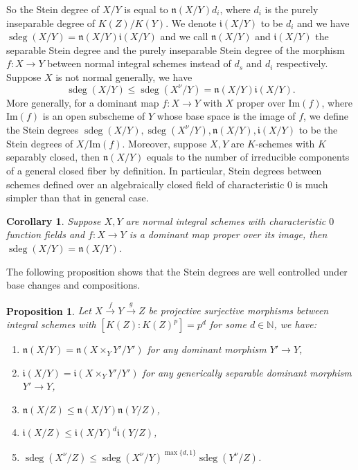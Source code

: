 \documentclass[letterpaper,reqno,12pt]{amsart}
\DeclareMathOperator{\sdeg}{sdeg}
\numberwithin{equation}{section}
\theoremstyle{plain}
\newtheorem{proposition}[theorem]{Proposition}
\newtheorem{corollary}[theorem]{Corollary}
\begin{document}
So the Stein degree of $X/Y$ is equal to $\mathfrak n(X/Y)d_i$, where $d_i$ is the purely inseparable degree of $K(Z)/K(Y)$. We denote $\mathfrak i(X/Y)$ to be $d_i$ and we have $\sdeg(X/Y)=\mathfrak n(X/Y)\mathfrak i(X/Y)$ and we call $\mathfrak n(X/Y)$ and $\mathfrak i(X/Y)$ the separable Stein degree and the purely inseparable Stein degree of the morphism $f:X\to Y$ between normal integral schemes instead of $d_s$ and $d_i$ respectively. Suppose $X$ is not normal generally, we have 
\[\sdeg(X/Y)\leq\sdeg(X^\nu/Y)=\mathfrak n(X/Y)\mathfrak i(X/Y).\]
More generally, for a dominant map $f:X\to Y$ with $X$ proper over $\text{Im}(f)$, where $\text{Im}(f)$ is an open subscheme of $Y$ whose base space is the image of $f$, we define the Stein degrees $\sdeg(X/Y),\sdeg(X^\nu/Y),\mathfrak n(X/Y),\mathfrak i(X/Y)$ to be the Stein degrees of $X/\text{Im}(f)$. Moreover, suppose $X,Y$ are $K$-schemes with $K$ separably closed, then $\mathfrak n(X/Y)$ equals to the number of irreducible components of a general closed fiber by definition. In particular, Stein degrees between schemes defined over an algebraically closed field of characteristic $0$ is much simpler than that in general case.
\begin{corollary}
    Suppose $X,Y$ are normal integral schemes with characteristic $0$ function fields and $f:X\to Y$ is a dominant map proper over its image, then $\sdeg(X/Y)=\mathfrak n(X/Y)$.
\end{corollary}
The following proposition shows that the Stein degrees are well controlled under base changes and compositions.
\begin{proposition}\label{composition}
    Let $X\xrightarrow{f} Y\xrightarrow{g} Z$ be projective surjective morphisms between integral schemes with $[K(Z):K(Z)^p]=p^d$ for some $d\in \mathbb N$,  we have:
    \begin{enumerate}
        \item $\mathfrak n(X/Y)=\mathfrak n(X\times_Y Y'/Y')$ for any dominant morphism $Y'\to Y$, 
        \item $\mathfrak i(X/Y)=\mathfrak i(X\times_Y Y'/Y')$  for any generically separable dominant morphism $Y'\to Y$,
        \item $\mathfrak n(X/Z)\leq \mathfrak n(X/Y)\mathfrak n(Y/Z)$,
        \item $\mathfrak i(X/Z)\leq \mathfrak i(X/Y)^d\mathfrak i(Y/Z)$,
        \item $\sdeg(X^\nu/Z)\leq \sdeg(X^\nu/Y)^{\max\{d,1\}}\sdeg(Y^\nu/Z)$.
    \end{enumerate}
\end{proposition}
\end{document}
